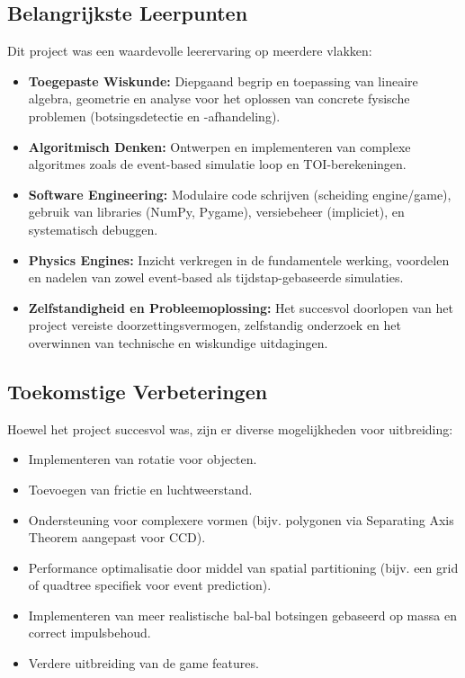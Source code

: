 \documentclass[11pt, a4paper]{article}
\begin{document}
\subsection{Belangrijkste Leerpunten}
Dit project was een waardevolle leerervaring op meerdere vlakken:
\begin{itemize}
    \item \textbf{Toegepaste Wiskunde:} Diepgaand begrip en toepassing van lineaire algebra, geometrie en analyse voor het oplossen van concrete fysische problemen (botsingsdetectie en -afhandeling).
    \item \textbf{Algoritmisch Denken:} Ontwerpen en implementeren van complexe algoritmes zoals de event-based simulatie loop en TOI-berekeningen.
    \item \textbf{Software Engineering:} Modulaire code schrijven (scheiding engine/game), gebruik van libraries (NumPy, Pygame), versiebeheer (impliciet), en systematisch debuggen.
    \item \textbf{Physics Engines:} Inzicht verkregen in de fundamentele werking, voordelen en nadelen van zowel event-based als tijdstap-gebaseerde simulaties.
    \item \textbf{Zelfstandigheid en Probleemoplossing:} Het succesvol doorlopen van het project vereiste doorzettingsvermogen, zelfstandig onderzoek en het overwinnen van technische en wiskundige uitdagingen.
\end{itemize}

\subsection{Toekomstige Verbeteringen}
Hoewel het project succesvol was, zijn er diverse mogelijkheden voor uitbreiding:
\begin{itemize}
    \item Implementeren van rotatie voor objecten.
    \item Toevoegen van frictie en luchtweerstand.
    \item Ondersteuning voor complexere vormen (bijv. polygonen via Separating Axis Theorem aangepast voor CCD).
    \item Performance optimalisatie door middel van spatial partitioning (bijv. een grid of quadtree specifiek voor event prediction).
    \item Implementeren van meer realistische bal-bal botsingen gebaseerd op massa en correct impulsbehoud.
    \item Verdere uitbreiding van de game features.
\end{itemize}

\newpage
\printbibliography[heading=bibintoc, title={}] %
\end{document}
